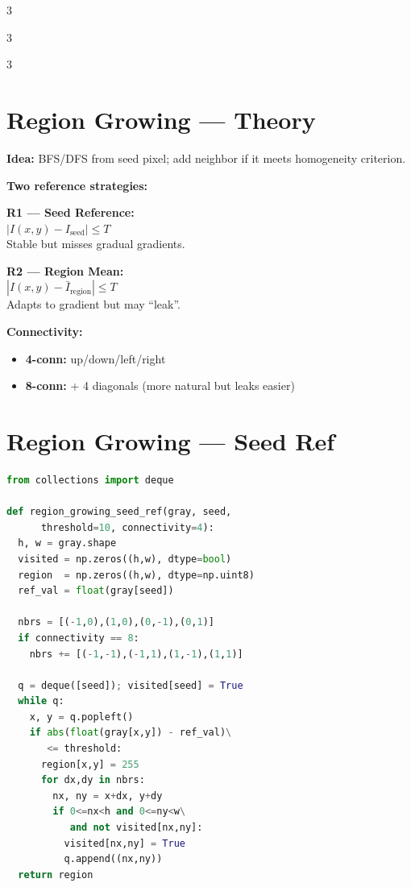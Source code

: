 \documentclass[9pt,landscape,a4paper]{extarticle}
\begin{document}
\begin{multicols*}{3}
\begin{multicols*}{3}
\begin{multicols}{3}
\section{Region Growing --- Theory}

\textbf{Idea:} BFS/DFS from seed pixel; add neighbor if it meets homogeneity criterion.

\textbf{Two reference strategies:}

\begin{infobox}
\textbf{R1 --- Seed Reference:}\\
$|I(x,y) - I_{\text{seed}}| \leq T$\\
Stable but misses gradual gradients.
\end{infobox}

\begin{infobox}
\textbf{R2 --- Region Mean:}\\
$|I(x,y) - \bar{I}_{\text{region}}| \leq T$\\
Adapts to gradient but may ``leak''.
\end{infobox}

\textbf{Connectivity:}
\begin{itemize}
  \item \textbf{4-conn:} up/down/left/right
  \item \textbf{8-conn:} + 4 diagonals (more natural but leaks easier)
\end{itemize}

\section{Region Growing --- Seed Ref}

\begin{lstlisting}[language=Python]
from collections import deque

def region_growing_seed_ref(gray, seed,
      threshold=10, connectivity=4):
  h, w = gray.shape
  visited = np.zeros((h,w), dtype=bool)
  region  = np.zeros((h,w), dtype=np.uint8)
  ref_val = float(gray[seed])

  nbrs = [(-1,0),(1,0),(0,-1),(0,1)]
  if connectivity == 8:
    nbrs += [(-1,-1),(-1,1),(1,-1),(1,1)]

  q = deque([seed]); visited[seed] = True
  while q:
    x, y = q.popleft()
    if abs(float(gray[x,y]) - ref_val)\
       <= threshold:
      region[x,y] = 255
      for dx,dy in nbrs:
        nx, ny = x+dx, y+dy
        if 0<=nx<h and 0<=ny<w\
           and not visited[nx,ny]:
          visited[nx,ny] = True
          q.append((nx,ny))
  return region
\end{lstlisting}


\end{multicols}
\end{multicols*}
\end{multicols*}
\end{document}

